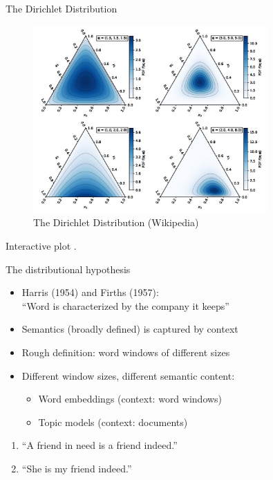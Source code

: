 \documentclass[10pt]{beamer}
\begin{document}
\begin{frame}{The Dirichlet Distribution}


\begin{figure}[h]
\centering
\includegraphics[width=0.8\textwidth]{fig/dirichlet.jpg}
\caption{The Dirichlet Distribution (Wikipedia)}
\end{figure}

Interactive plot \href{https://chart-studio.plotly.com/~david_avakian/14.embed}{}.

\end{frame}



\begin{frame}{The distributional hypothesis}

\begin{itemize}
    \item Harris (1954) and Firths (1957): \\ ``Word is characterized by the company it keeps''
    \pause
    \item Semantics (broadly defined) is captured by {\color{uured} context}\pause
    \item Rough definition: {\color{uured} word windows} of different sizes\pause
    \item Different window sizes, different {\color{uured} semantic} content:
    \begin{itemize}
      \item Word embeddings (context: word windows)
      \item Topic models (context: documents)
    \end{itemize}
\end{itemize}

\begin{example}
\begin{enumerate}
    \item ``A friend in need is a friend indeed.''
    \item ``She is my friend indeed.''
\end{enumerate}
\end{example}
\end{frame}
\end{document}
